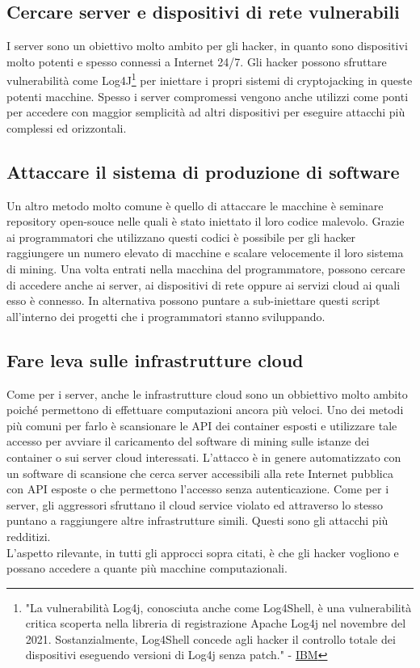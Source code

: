 \documentclass[12pt,a4paper]{article}
\begin{document}
\subsection{Cercare server e dispositivi di rete vulnerabili}
I server sono un obiettivo molto ambito per gli hacker, in quanto sono
dispositivi molto potenti e spesso connessi a Internet 24/7. Gli hacker possono
sfruttare vulnerabilità come Log4J\footnote{"La vulnerabilità Log4j, conosciuta
anche come Log4Shell, è una vulnerabilità critica scoperta nella libreria di
registrazione Apache Log4j nel novembre del 2021. Sostanzialmente, Log4Shell
concede agli hacker il controllo totale dei dispositivi eseguendo versioni di
Log4j senza patch." - \href{https://arc.net/l/quote/zjujxamu}{IBM}} per
iniettare i propri sistemi di cryptojacking in queste potenti macchine. Spesso i
server compromessi vengono anche utilizzi come ponti per accedere con maggior
semplicità ad altri dispositivi per eseguire attacchi più complessi ed
orizzontali.

\subsection{Attaccare il sistema di produzione di software}
Un altro metodo molto comune è quello di attaccare le macchine è seminare
repository open-souce nelle quali è stato iniettato il loro codice malevolo.
Grazie ai programmatori che utilizzano questi codici è possibile per gli hacker
raggiungere un numero elevato di macchine e scalare velocemente il loro sistema
di mining. Una volta entrati nella macchina del programmatore, possono cercare
di accedere anche ai server, ai dispositivi di rete oppure ai servizi cloud ai
quali esso è connesso. In alternativa possono puntare a sub-iniettare questi
script all'interno dei progetti che i programmatori stanno sviluppando.

\subsection{Fare leva sulle infrastrutture cloud}
Come per i server, anche le infrastrutture cloud sono un obbiettivo molto ambito
poiché permettono di effettuare computazioni ancora più veloci. Uno dei metodi
più comuni per farlo è scansionare le API dei container esposti e utilizzare
tale accesso per avviare il caricamento del software di mining sulle istanze dei
container o sui server cloud interessati. L'attacco è in genere automatizzato
con un software di scansione che cerca server accessibili alla rete Internet
pubblica con API esposte o che permettono l'accesso senza autenticazione. Come
per i server, gli aggressori sfruttano il cloud service violato ed attraverso lo
stesso puntano a raggiungere altre infrastrutture simili. Questi sono gli
attacchi più redditizi. \\
L'aspetto rilevante, in tutti gli approcci sopra citati, è che gli hacker
vogliono e possano accedere a quante più macchine computazionali.
\end{document}
